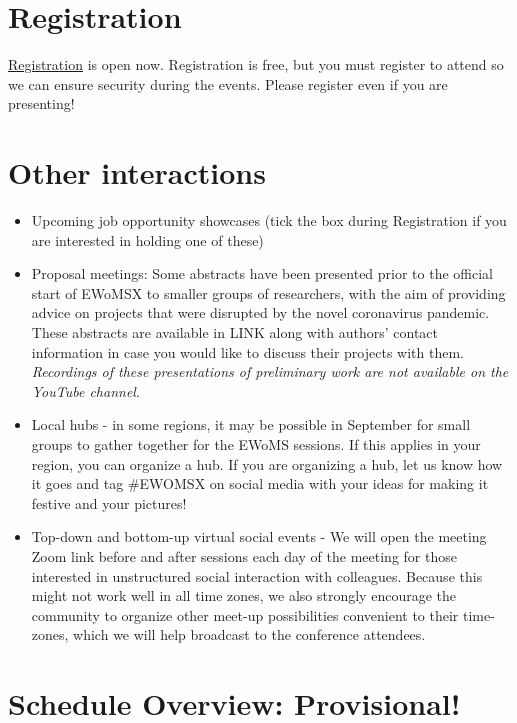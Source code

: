 \documentclass[
  12pt,
]{book}
\begin{document}
\hypertarget{registration}{%
\section{Registration}\label{registration}}

\href{https://cardiffunipsych.eu.qualtrics.com/jfe/form/SV_0VYX845gbq54Arr}{Registration} is open now. Registration is free, but you must register to attend so we can ensure security during the events. Please register even if you are presenting!

\hypertarget{other-interactions}{%
\section{Other interactions}\label{other-interactions}}

\begin{itemize}
\item
  Upcoming job opportunity showcases (tick the box during Registration if you are interested in holding one of these)
\item
  Proposal meetings: Some abstracts have been presented prior to the official start of EWoMSX to smaller groups of researchers, with the aim of providing advice on projects that were disrupted by the novel coronavirus pandemic. These abstracts are available in LINK along with authors' contact information in case you would like to discuss their projects with them. \emph{Recordings of these presentations of preliminary work are not available on the YouTube channel}.
\item
  Local hubs - in some regions, it may be possible in September for small groups to gather together for the EWoMS sessions. If this applies in your region, you can organize a hub. If you are organizing a hub, let us know how it goes and tag \#EWOMSX on social media with your ideas for making it festive and your pictures!
\item
  Top-down and bottom-up virtual social events - We will open the meeting Zoom link before and after sessions each day of the meeting for those interested in unstructured social interaction with colleagues. Because this might not work well in all time zones, we also strongly encourage the community to organize other meet-up possibilities convenient to their time-zones, which we will help broadcast to the conference attendees.
\end{itemize}

\hypertarget{schedule-overview-provisional}{%
\section{Schedule Overview: Provisional!}\label{schedule-overview-provisional}}
\end{document}

